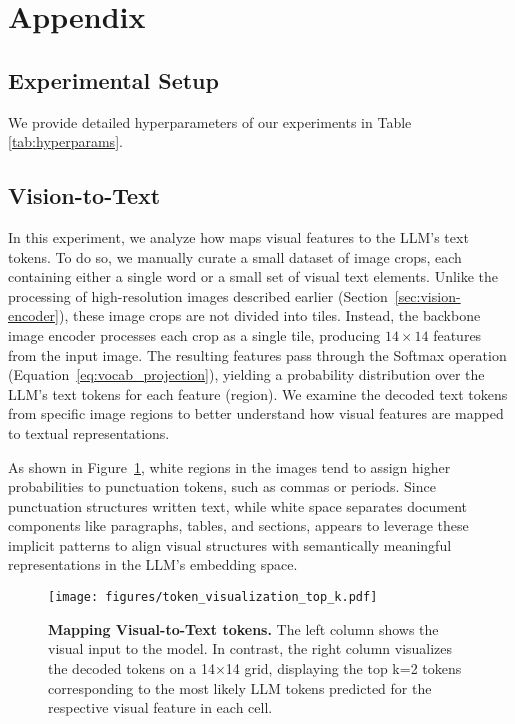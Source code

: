 \section{Appendix}\label{appendix:foo}

\subsection{Experimental Setup}
\label{app:hyperparameters}
We provide detailed hyperparameters of our experiments in Table \ref{tab:hyperparams}.





\subsection{Vision-to-Text}
\label{app:vision_to_text}

In this experiment, we analyze how \alignmodule{} maps visual features to the LLM’s text tokens. To do so, we manually curate a small dataset of image crops, each containing either a single word or a small set of visual text elements. Unlike the processing of high-resolution images described earlier (Section~\ref{sec:vision-encoder}), these image crops are not divided into tiles. Instead, the backbone image encoder processes each crop as a single tile, producing $14 \times 14$ features from the input image. The resulting features pass through the Softmax operation (Equation~\ref{eq:vocab_projection}), yielding a probability distribution over the LLM's text tokens for each feature (region). We examine the decoded text tokens from specific image regions to better understand how visual features are mapped to textual representations.

As shown in Figure~\ref{fig:text-vision-alignment}, white regions in the images tend to assign higher probabilities to punctuation tokens, such as commas or periods. Since punctuation structures written text, while white space separates document components like paragraphs, tables, and sections, \alignmodule{} appears to leverage these implicit patterns to align visual structures with semantically meaningful representations in the LLM’s embedding space.


\begin{figure}[hb]
    \centering
    \texttt{[image: figures/token\_visualization\_top\_k.pdf]}
    \caption{\textbf{Mapping Visual-to-Text tokens.}  The left column shows the visual input to the model. In contrast, the right column visualizes the decoded tokens on a 14×14 grid, displaying the top k=2 tokens corresponding to the most likely LLM tokens predicted for the respective visual feature in each cell.}
    \label{fig:text-vision-alignment}
\end{figure}


